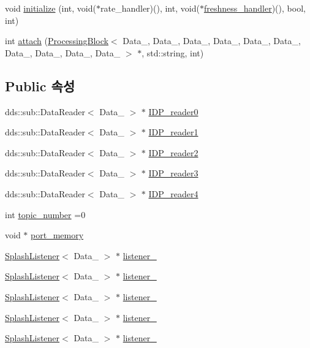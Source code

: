 \begin{DoxyCompactItemize}
\item 
void \hyperlink{classInputDataPort__PB_a82f95db8959ef080941612f64620c8c7}{initialize} (int, void($\ast$rate\+\_\+handler)(), int, void($\ast$\hyperlink{sample__main_8cpp_ae2b580f894f38496da91bce6c31e186f}{freshness\+\_\+handler})(), bool, int)
\item 
int \hyperlink{classInputDataPort__PB_a1e2a0dd2fc47211496927695a511e1a5}{attach} (\hyperlink{classProcessingBlock}{Processing\+Block}$<$ Data\+\_, Data\+\_, Data\+\_, Data\+\_, Data\+\_, Data\+\_, Data\+\_, Data\+\_, Data\+\_, Data\+\_ $>$ $\ast$, std\+::string, int)
\end{DoxyCompactItemize}
\subsection*{Public 속성}
\begin{DoxyCompactItemize}
\item 
dds\+::sub\+::\+Data\+Reader$<$ Data\+\_ $>$ $\ast$ \hyperlink{classInputDataPort__PB_ad5db737ed9b58633643a0595cd476083}{I\+D\+P\+\_\+reader0}
\item 
dds\+::sub\+::\+Data\+Reader$<$ Data\+\_ $>$ $\ast$ \hyperlink{classInputDataPort__PB_a70658e2c639e868dc0524b4f97c09da8}{I\+D\+P\+\_\+reader1}
\item 
dds\+::sub\+::\+Data\+Reader$<$ Data\+\_ $>$ $\ast$ \hyperlink{classInputDataPort__PB_a63c8784d2ee1568f704a11e4eea03ca6}{I\+D\+P\+\_\+reader2}
\item 
dds\+::sub\+::\+Data\+Reader$<$ Data\+\_ $>$ $\ast$ \hyperlink{classInputDataPort__PB_a59119679d668507d06016fb12640c80c}{I\+D\+P\+\_\+reader3}
\item 
dds\+::sub\+::\+Data\+Reader$<$ Data\+\_ $>$ $\ast$ \hyperlink{classInputDataPort__PB_aeb99473c8a874344cd133be87607bad2}{I\+D\+P\+\_\+reader4}
\item 
int \hyperlink{classInputDataPort__PB_ae994da4cf26fd15afa7e3c6ac90aa159}{topic\+\_\+number} =0
\item 
void $\ast$ \hyperlink{classInputDataPort__PB_a3f273b7df3b5eb322a422a7d8b80a05f}{port\+\_\+memory}
\item 
\hyperlink{classSplashListener}{Splash\+Listener}$<$ Data\+\_ $>$ $\ast$ \hyperlink{classInputDataPort__PB_a77b666d75615c4284e2e894e2a93d0ce}{listener\+\_}
\item 
\hyperlink{classSplashListener}{Splash\+Listener}$<$ Data\+\_ $>$ $\ast$ \hyperlink{classInputDataPort__PB_acb665e197ba9b211af65cd591467ba66}{listener\+\_}
\item 
\hyperlink{classSplashListener}{Splash\+Listener}$<$ Data\+\_ $>$ $\ast$ \hyperlink{classInputDataPort__PB_af24e1027929b9fd004b1498b54e6173c}{listener\+\_}
\item 
\hyperlink{classSplashListener}{Splash\+Listener}$<$ Data\+\_ $>$ $\ast$ \hyperlink{classInputDataPort__PB_a3045eef4ff7effbb5a8fbfb7552dbb03}{listener\+\_}
\item 
\hyperlink{classSplashListener}{Splash\+Listener}$<$ Data\+\_ $>$ $\ast$ \hyperlink{classInputDataPort__PB_a89c99b63027e15f821a9859d3b988173}{listener\+\_}
\end{DoxyCompactItemize}
